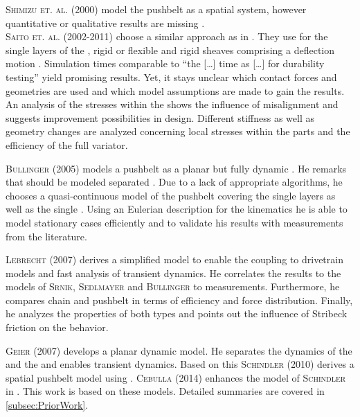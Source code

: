 \textsc{Shimizu et. al.} (2000) model the pushbelt \CVT as a spatial \FE system, however quantitative or qualitative results are missing \cite{shimizu_development_2000}.\\
\textsc{Saito et. al.} (2002-2011) choose a similar approach as in \cite{shimizu_development_2000}.
They use \FEs for the single layers of the \rings, rigid or flexible \els and rigid sheaves comprising a deflection motion \cite{saito_development_2002, saito_application_2006, saito_study_2011}.
Simulation times comparable to ``the [\ldots] time as [\ldots] for durability testing'' \cite[p. 228]{saito_application_2006} yield promising results.
Yet, it stays unclear which contact forces and geometries are used and which model assumptions are made to gain the results. 
An analysis of the stresses within the \rings shows the influence of misalignment and suggests improvement possibilities in design.
Different stiffness as well as geometry changes are analyzed concerning local stresses within the parts and the efficiency of the full variator.\par  


\textsc{Bullinger} (2005) models a pushbelt \CVT as a planar but fully dynamic \MBS. 
He remarks that \els should be modeled separated \cite[p. 82]{bullinger_dynamik_2005}. 
Due to a lack of appropriate algorithms, he chooses a quasi-continuous model of the pushbelt covering the single \ring layers as well as the single \els.
Using an Eulerian description for the kinematics he is able to model stationary cases efficiently and to validate his results with measurements from the literature.\par 

\textsc{Lebrecht} (2007) derives a simplified model to enable the coupling to drivetrain models and fast analysis of transient dynamics. 
He correlates the results to the models of \textsc{Srnik, Sedlmayer} and \textsc{Bullinger} to measurements.
Furthermore, he compares chain and pushbelt \CVTs in terms of efficiency and force distribution.
Finally, he analyzes the \NVH properties of both types and points out the influence of Stribeck friction on the \NVH behavior.%

\textsc{Geier} (2007) develops a planar dynamic \CVT model.
He separates the dynamics of the \els and the \rings \cite{geier_dynamics_2007} and enables transient dynamics. 
Based on this \textsc{Schindler} (2010) derives a spatial pushbelt \CVT model using \MBS \cite{schindler_spatial_2010, schindler_spatial_2012}.
\textsc{Cebulla} (2014) enhances the model of \textsc{Schindler} in \cite{cebulla_spatial_2014}.
This work is based on these models.
Detailed summaries are covered in \cref{subsec:PriorWork}. 

